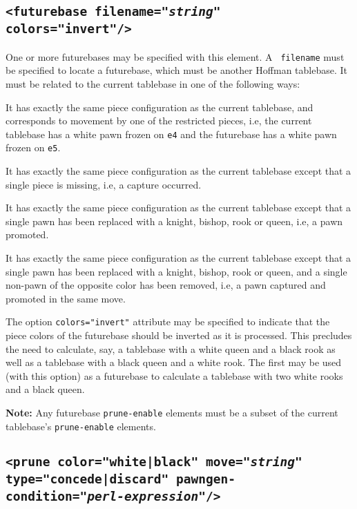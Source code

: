 \documentclass[11pt]{article}
\begin{document}
\subsection{\tt <futurebase filename="{\it string}" colors="invert"/>}

One or more futurebases may be specified with this element.  A {\tt
  filename} must be specified to locate a futurebase, which must be
another Hoffman tablebase.  It must be related to the current
tablebase in one of the following ways:

\begin{description}
\item It has exactly the same piece configuration as the
current tablebase, and corresponds to movement by one of the
restricted pieces, i.e, the current tablebase has a white pawn frozen
on {\tt e4} and the futurebase has a white pawn frozen on {\tt e5}.

\item It has exactly the same piece configuration as
the current tablebase except that a single piece is missing, i.e,
a capture occurred.

\item It has exactly the same piece configuration as the current
tablebase except that a single pawn has been replaced with a knight,
bishop, rook or queen, i.e, a pawn promoted.

\item It has exactly the same piece configuration as the current
tablebase except that a single pawn has been replaced with a knight,
bishop, rook or queen, and a single non-pawn of the opposite color has
been removed, i.e, a pawn captured and promoted in the same move.

\end{description}

The option {\tt colors="invert"} attribute may be specified to indicate
that the piece colors of the futurebase should be inverted as it is
processed.  This precludes the need to calculate, say, a tablebase
with a white queen and a black rook as well as a tablebase with a
black queen and a white rook.  The first may be used (with this
option) as a futurebase to calculate a tablebase with two white rooks
and a black queen.

{\bf Note:} Any futurebase {\tt prune-enable} elements must be a subset of
the current tablebase's {\tt prune-enable} elements.

\subsection{\tt <prune color="white|black" move="{\it string}" type="concede|discard" \hfil\break\hbox{\qquad} pawngen-condition="{\it perl-expression}"/>}
\end{document}
